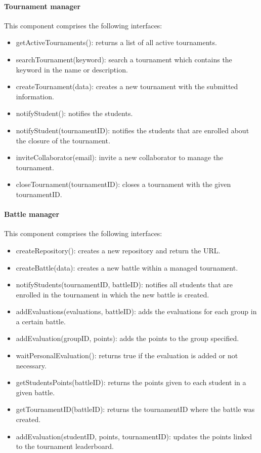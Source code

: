 \documentclass[12pt, a4paper]{report}
\begin{document}
    \paragraph*{Tournament manager}
    This component comprises the following interfaces: 
    \begin{itemize}
        \item getActiveTournaments(): returns a list of all active tournaments. 
        \item searchTournament(keyword): search a tournament which contains the keyword in the name or description. 
        \item createTournament(data): creates a new tournament with the submitted information. 
        \item notifyStudent(): notifies the students.
        \item notifyStudent(tournamentID): notifies the students that are enrolled about the closure of the tournament.
        \item inviteCollaborator(email): invite a new collaborator to manage the tournament. 
        \item closeTournament(tournamentID): closes a tournament with the given tournamentID. 
    \end{itemize}

    \paragraph*{Battle manager}
    This component comprises the following interfaces: 
    \begin{itemize}
        \item createRepository(): creates a new repository and return the URL. 
        \item createBattle(data): creates a new battle within a managed tournament. 
        \item notifyStudents(tournamentID, battleID): notifies all students that are enrolled in the tournament in which the new battle is created. 
        \item addEvaluations(evaluations, battleID): adds the evaluations for each group in a certain battle. 
        \item addEvaluation(groupID, points): adds the points to the group specified. 
        \item waitPersonalEvaluation(): returns true if the evaluation is added or not necessary. 
        \item getStudentsPoints(battleID): returns the points given to each student in a given battle. 
        \item getTournamentID(battleID): returns the tournamentID where the battle was created. 
        \item addEvaluation(studentID, points, tournamentID): updates the points linked to the tournament leaderboard. 
    \end{itemize}
\end{document}
